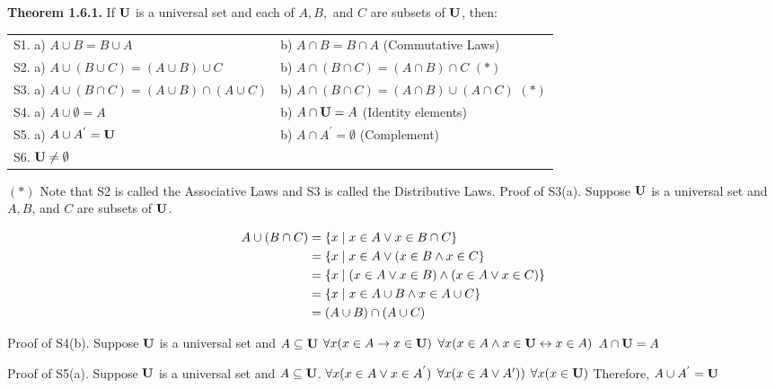 \begin{large}
\textbf{Theorem 1.6.1.} If $\textbf{U}$ is a universal set and each of $A, B,$ and $C$ are subsets of $\textbf{U}$, then: \nl
\begin{tabular}{l l}
S1.  a) $A \cup B = B \cup A$ &  b) $A \cap B=B \cap A$ (Commutative Laws)\\
S2.  a) $A \cup (B\cup C)=(A \cup B)\cup C$ & b) $A\cap (B\cap C)= (A\cap B)\cap C$ $(*)$ \\
S3. a) $A\cup (B\cap C)=(A\cup B)\cap (A\cup C)$ & b) $A\cap (B\cap C)=(A\cap B)\cup (A\cap C)$ $(*)$\\
S4. a) $A \cup \emptyset = A$ & b) $A \cap \textbf{U} = A$
(Identity elements) \\
S5. a) $A \cup A^{'} = \textbf{U}$ & b) $A \cap A^{'} = \emptyset $
(Complement)\\
S6. $\textbf{U} \neq \emptyset $&\\
\end{tabular}\nl
$(*)$ Note that S2 is called the Associative Laws and S3 is called the Distributive Laws.\nl
Proof of S3(a). Suppose $\textbf{U}$ is a universal set and $A, B$, and $C$ are subsets of $\textbf{U}$.\nl

\begin{alignat}{2}
A \cup (B \cap C) &= \{x \mid x \in A \lor x \in B \cap C\}\\
&= \{x \mid x \in A \lor (x\in B \wedge x \in C\}\\
&= \{x \mid (x \in A \lor x \in B) \wedge (x \in A \lor x \in C)\}\\
&= \{x \mid x\in A \cup B \wedge x \in A \cup C\}\\
&= (A \cup B) \cap (A \cup C)
\notag
\end{alignat}

Proof of S4(b). Suppose $\textbf{U}$ is a universal set and $A \subseteq \textbf{U}$  \nl
$\forall x(x \in A \to x \in \textbf{U} )$ \nl
$\forall x(x \in A \wedge x \in \textbf{U}  \leftrightarrow x \in A)$ \nl
$ A \cap \textbf{U} = A $ \nl

Proof of S5(a). Suppose $\textbf{U}$ is a universal set and $A \subseteq \textbf{U} $. \nl
$\forall x (x \in A \lor x \in A^{'}) $\nl
$\forall x(x \in A \lor A{'})) $ \nl
$\forall x(x \in \textbf{U})$ \nl
Therefore, \nl
$A \cup A^{'} = \textbf{U}$ \nl

\newpage



\end{large}

